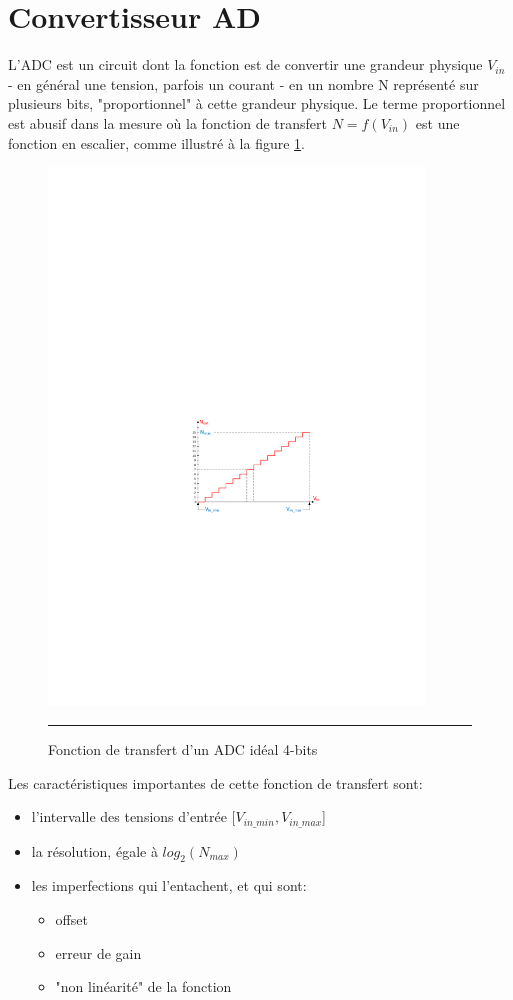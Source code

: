 \section{Convertisseur AD}
L'ADC est un circuit dont la fonction est de convertir une grandeur physique $V_{in}$ - en général une tension, parfois un courant - en un nombre N représenté sur plusieurs bits, "proportionnel" à cette grandeur physique.
Le terme proportionnel est abusif dans la mesure où la fonction de transfert $N = f(V_{in})$ est une fonction en escalier, comme illustré à la figure \ref{fig:ADC_Fonction}.

\begin{figure}[htb]
  \centering
  \includegraphics [angle=0, width=10cm]{./Figures/Chap11_ADC/ADC_Fonction.pdf}
  \rule{35em}{0.5pt}
  \caption{Fonction de transfert d'un ADC idéal 4-bits}
  \label{fig:ADC_Fonction}
\end{figure}

Les caractéristiques importantes de cette fonction de transfert sont:
\begin{itemize}[label=\textbullet,font=\small]
\item l'intervalle des tensions d'entrée $[V_{in\_min}, V_{in\_max}$]
\item la résolution, égale à $log_{2}(N_{max})$
\item les imperfections qui l'entachent, et qui sont:
\begin{itemize}[label=\textbullet,font=\small]
\item offset
\item erreur de gain
\item "non linéarité" de la fonction
\end{itemize}
\end{itemize}

